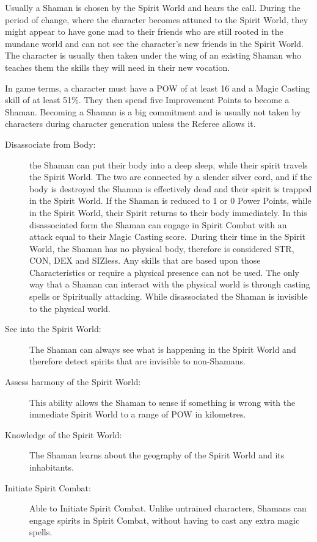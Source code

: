 Usually a Shaman is chosen by the Spirit World and hears the call. During the period of change, where the character becomes attuned to the Spirit World, they might appear to have gone mad to their friends who are still rooted in the mundane world and can not see the character’s new friends in the Spirit World.  The character is usually then taken under the wing of an existing Shaman who teaches them the skills they will need in their new vocation.

In game terms, a character must have a POW of at least 16 and a Magic Casting skill of at least 51\%. They then spend five Improvement Points to become a Shaman. Becoming a Shaman is a big commitment and is usually not taken by characters during character generation unless the Referee allows it.


\begin{description}
\item[Disassociate from Body:] the Shaman can put their body into a deep sleep, while their spirit travels the Spirit World. The two are connected by a slender silver cord, and if the body is destroyed the Shaman is effectively dead and their spirit is trapped in the Spirit World. If the Shaman is reduced to 1 or 0 Power Points, while in the Spirit World, their Spirit returns to their body immediately. In this disassociated form the Shaman can engage in Spirit Combat with an attack equal to their Magic Casting score. During their time in the Spirit World, the Shaman has no physical body, therefore is considered STR, CON, DEX and SIZless. Any skills that are based upon those Characteristics or require a physical presence can not be used. The only way that a Shaman can interact with the physical world is through casting spells or Spiritually attacking. While disassociated the Shaman is invisible to the physical world.

\item[See into the Spirit World:] The Shaman can always see what is happening in the Spirit World and therefore detect spirits that are invisible to non-Shamans.

\item[Assess harmony of the Spirit World:] This ability allows the Shaman to sense if something is wrong with the immediate Spirit World to a range of POW in kilometres. 

\item[Knowledge of the Spirit World:] The Shaman learns about the geography of the Spirit World and its inhabitants.

\item[Initiate Spirit Combat:] Able to Initiate Spirit Combat. Unlike untrained characters, Shamans can engage spirits in Spirit Combat, without having to cast any extra magic spells.
\end{description}


